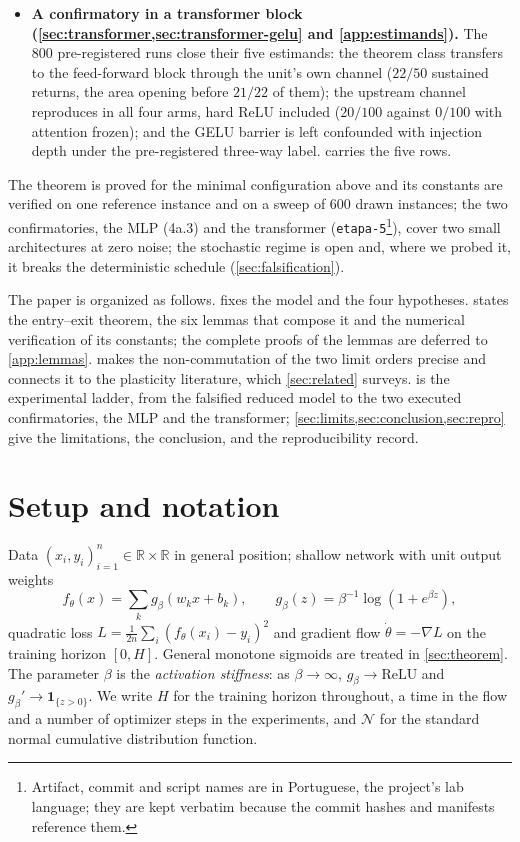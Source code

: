 \documentclass[11pt]{article}
\theoremstyle{definition}
\theoremstyle{remark}
\newcommand{\R}{\mathbb{R}}
\begin{document}
\begin{itemize}
\item \textbf{A confirmatory in a transformer block
(\cref{sec:transformer,sec:transformer-gelu} and \cref{app:estimands}).} The
800 pre-registered runs close their five estimands: the theorem class transfers
to the feed-forward block through the unit's own channel ($22/50$ sustained
returns, the area opening before $21/22$ of them); the upstream channel
reproduces in all four arms, hard ReLU included ($20/100$ against $0/100$ with
attention frozen); and the GELU barrier is left confounded with injection depth
under the pre-registered three-way label.  carries the five rows.
\end{itemize}

The theorem is proved for the minimal configuration above and its constants
are verified on one reference instance and on a sweep of 600 drawn instances;
the two confirmatories, the MLP (4a.3) and the transformer
(\texttt{etapa-5}\footnote{Artifact, commit and script names are in
Portuguese, the project's lab language; they are kept verbatim because the
commit hashes and manifests reference them.}), cover two small architectures
at zero noise; the stochastic regime is open and, where we probed it, it
breaks the deterministic schedule (\cref{sec:falsification}).

The paper is organized as follows.  fixes the model and the four
hypotheses.  states the entry--exit theorem, the six lemmas
that compose it and the numerical verification of its constants; the complete
proofs of the lemmas are deferred to \cref{app:lemmas}.  makes
the non-commutation of the two limit orders precise and connects it to the
plasticity literature, which \cref{sec:related} surveys. 
is the experimental ladder, from the falsified reduced model to the two executed
confirmatories, the MLP and the transformer;
\cref{sec:limits,sec:conclusion,sec:repro} give
the limitations, the conclusion, and the reproducibility record.

\section{Setup and notation}\label{sec:setup}

Data $(x_i,y_i)_{i=1}^n\in\R\times\R$ in general position; shallow network with
unit output weights
\begin{equation}\label{eq:net}
f_\theta(x)=\sum_{k} g_\beta(w_kx+b_k),
\qquad
g_\beta(z)=\beta^{-1}\log(1+e^{\beta z}),
\end{equation}
quadratic loss $L=\tfrac1{2n}\sum_i(f_\theta(x_i)-y_i)^2$ and gradient flow
$\dot\theta=-\nabla L$ on the training horizon $[0,H]$. General monotone sigmoids
are treated in \cref{sec:theorem}. The parameter $\beta$ is the
\emph{activation stiffness}: as $\beta\to\infty$, $g_\beta\to\mathrm{ReLU}$ and
$g_\beta'\to\mathbf 1_{\{z>0\}}$. We write $H$ for the training horizon
throughout, a time in the flow and a number of optimizer steps in the
experiments, and $\mathcal N$ for the standard normal cumulative distribution
function.
\end{document}
